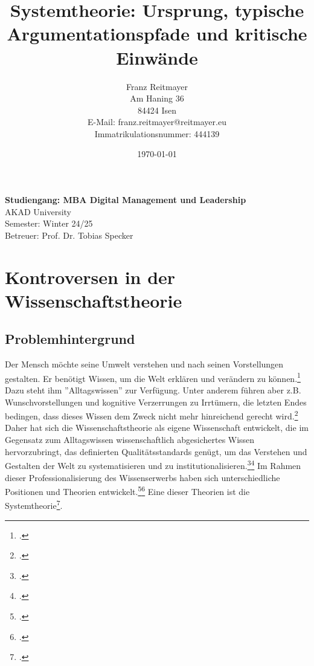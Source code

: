 \documentclass[a4paper,12pt]{article}
\title{Systemtheorie: Ursprung, typische Argumentationspfade und kritische Einwände}
\date{\today}
\begin{document}
\author{
    Franz Reitmayer \\
    Am Haning 36 \\
    84424 Isen \\
    E-Mail: franz.reitmayer@reitmayer.eu \\ 
    Immatrikulationsnummer: 444139
}

\maketitle
\vfill
\begin{center}
\textbf{Studiengang: MBA Digital Management und Leadership} \\
AKAD University \\
Semester: Winter 24/25 \\
Betreuer: Prof. Dr. Tobias Specker \\

\end{center}
\vfill
\newpage
\tableofcontents
\newpage



\section{Kontroversen in der Wissenschaftstheorie}
\subsection{Problemhintergrund}
Der Mensch möchte seine Umwelt verstehen und nach seinen Vorstellungen gestalten. Er benötigt Wissen, um die Welt erklären und verändern zu können.\footcite[S. 1]{Helfrich2024} Dazu steht ihm ''Alltagswissen'' zur Verfügung. Unter anderem führen aber z.B. Wunschvorstellungen und kognitive Verzerrungen zu Irrtümern, die letzten Endes bedingen, dass dieses Wissen dem Zweck nicht mehr hinreichend gerecht wird.\footcite[S. 9]{Helfrich2024} Daher hat sich die Wissenschaftstheorie als eigene Wissenschaft entwickelt, die im Gegensatz zum Alltagswissen wissenschaftlich abgesichertes Wissen hervorzubringt, das definierten Qualitätsstandards genügt, um das Verstehen und Gestalten der Welt zu systematisieren und zu institutionalisieren.\footcite[Seite 4]{Kornmeier2007}\footcite[S. 3]{Helfrich2024} Im Rahmen dieser Professionalisierung des Wissenserwerbs haben sich unterschiedliche Positionen und Theorien entwickelt.\footcite[S. 19 ff]{Kornmesser2020}\footcite[S. 93]{Helfrich2024} Eine dieser Theorien ist die Systemtheorie\footcite[S. 107]{Helfrich2024}.
\end{document}
